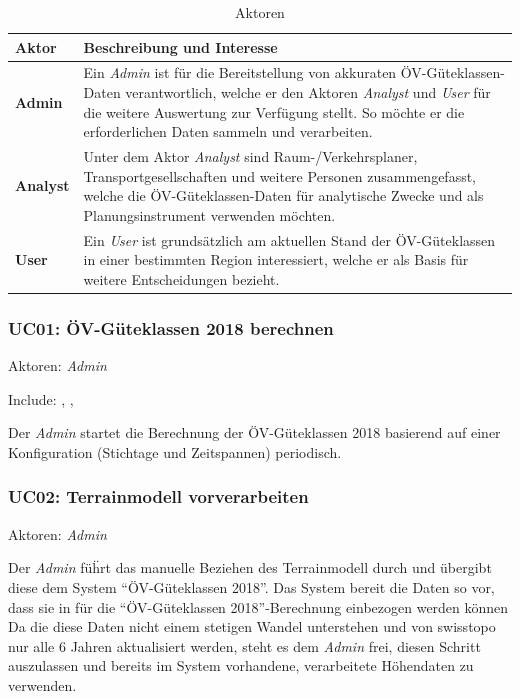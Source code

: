 \begin{table}[ht]
    \begin{tabular}{l p{14cm}}
        \toprule
        \textbf{Aktor}
                                & \textbf{Beschreibung und Interesse} \\
        \midrule
        \textbf{Admin}
                                & Ein \emph{Admin} ist für die Bereitstellung von akkuraten \acs{ÖV}-Güteklassen-Daten verantwortlich, welche er den Aktoren \emph{Analyst} und \emph{User} für die weitere Auswertung zur Verfügung stellt.
                                So möchte er die erforderlichen Daten sammeln und verarbeiten. \\
        \textbf{Analyst}
                                & Unter dem Aktor \emph{Analyst} sind Raum-/Verkehrsplaner, Transportgesellschaften und weitere Personen zusammengefasst, welche die \acs{ÖV}-Güteklassen-Daten für analytische Zwecke und als Planungsinstrument verwenden möchten. \\
        \textbf{User}
                                & Ein \emph{User} ist grundsätzlich am aktuellen Stand der \acs{ÖV}-Güteklassen in einer bestimmten Region interessiert, welche er als Basis für weitere Entscheidungen bezieht. \\
        \bottomrule
    \end{tabular}
    \caption{Aktoren}
    \label{table:Aktoren}
\end{table}

\subsubsection{UC01: ÖV-Güteklassen 2018 berechnen}
\label{Use Cases:UC01}

Aktoren: \emph{Admin}

Include: , , 

Der \emph{Admin} startet die Berechnung der \acs{ÖV}-Güteklassen 2018 basierend auf einer Konfiguration (Stichtage und Zeitspannen) periodisch.


\subsubsection{UC02: Terrainmodell vorverarbeiten}
\label{Use Cases:UC02}

Aktoren: \emph{Admin}

Der \emph{Admin} füḧrt das manuelle Beziehen des \gls{Terrainmodell} durch und übergibt diese dem System "`\acs{ÖV}-Güteklassen 2018"'.
Das System bereit die Daten so vor, dass sie in  für die "`\acs{ÖV}-Güteklassen 2018"'-Berechnung einbezogen werden können
Da die diese Daten nicht einem stetigen Wandel unterstehen und von swisstopo~\cite{swissalti3d_swisstopo} nur alle 6 Jahren aktualisiert werden, steht es dem \emph{Admin} frei, diesen Schritt auszulassen und bereits im System vorhandene, verarbeitete Höhendaten zu verwenden.

